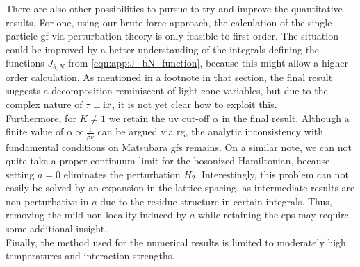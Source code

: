 There are also other possibilities to pursue to try and improve the quantitative results.
For one, using our brute-force approach, the calculation of the single-particle \gls{gf} via perturbation theory is only feasible to first order.
The situation could be improved by a better understanding of the integrals defining the functions $J_{b,N}$ from \autoref{eqn:app:J_bN_function}, because this might allow a higher order calculation.
As mentioned in a footnote in that section, the final result suggests a decomposition reminiscent of light-cone variables, but due to the complex nature of $\tau \pm \text{i} x$, it is not yet clear how to exploit this.\\
Furthermore, for $K\neq 1$ we retain the \acrshort{uv} cut-off $\alpha$ in the final result.
Although a finite value of $\alpha\propto\frac{1}{\beta v}$ can be argued via \gls{rg}, the analytic inconsistency with fundamental conditions on Matsubara \glspl{gf} remains.
On a similar note, we can not quite take a proper continuum limit for the bosonized Hamiltonian, because setting $a=0$ eliminates the perturbation $H_2$.
Interestingly, this problem can not easily be solved by an expansion in the lattice spacing, as intermediate results are non-perturbative in $a$ due to the residue structure in certain integrals.
Thus, removing the mild non-locality induced by $a$ while retaining the \glspl{ep} may require some additional insight.\\
Finally, the method used for the numerical results is limited to moderately high temperatures and interaction strengths.
